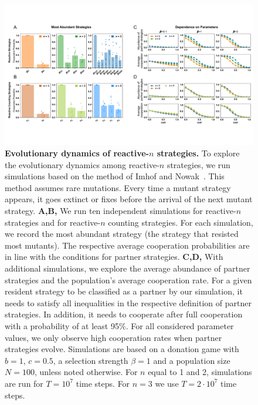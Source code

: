 \documentclass[9pt,twocolumn,twoside]{pnas-new}
\begin{document}
\begin{figure}[tbhp]
       \centering
       \includegraphics[width=\textwidth]{../../figures/abundant_strategies.pdf}
       \caption{\textbf{Evolutionary dynamics of reactive-$n$ strategies.}
       To explore the evolutionary dynamics among reactive-$n$ strategies, we run simulations based on the
       method of Imhof and Nowak~\cite{imhof:royal:2010}. 
       This method assumes rare mutations. 
       Every time a mutant strategy appears, it goes extinct or fixes before the arrival of the next mutant strategy. 
       {\bf A,B,} We run ten independent simulations for reactive-$n$ strategies and for reactive-$n$ counting strategies. 
       For each simulation, we record the most abundant strategy (the strategy that resisted most mutants). 
       The respective average cooperation probabilities are in line with the conditions for partner strategies. 
       {\bf C,D,} With additional simulations, we explore the average abundance of partner strategies and the population's average cooperation rate. 
       For a given resident strategy to be classified as a partner by our simulation, it needs to satisfy all inequalities in the respective definition of partner strategies. 
       In addition, it needs to cooperate after full cooperation with a probability of at least 95\%.  
       For all considered parameter values, we only observe high cooperation rates when partner strategies evolve. 
       Simulations are based on a donation game with \(b\!=\!1\),  \(c\!=\!0.5\), a selection strength $\beta\!=\!1$
       and a population size $N\!=\!100$, unless noted otherwise. For $n$ equal to 1 and 2, simulations are run for \(T\!=\! 10 ^ 7\) time steps. For $n\!=\!3$ we use \(T\!=\! 2 \!\cdot\!10 ^ 7\) time steps.
       }\label{fig:evolutionary_results}
\end{figure}
       
\end{document}
